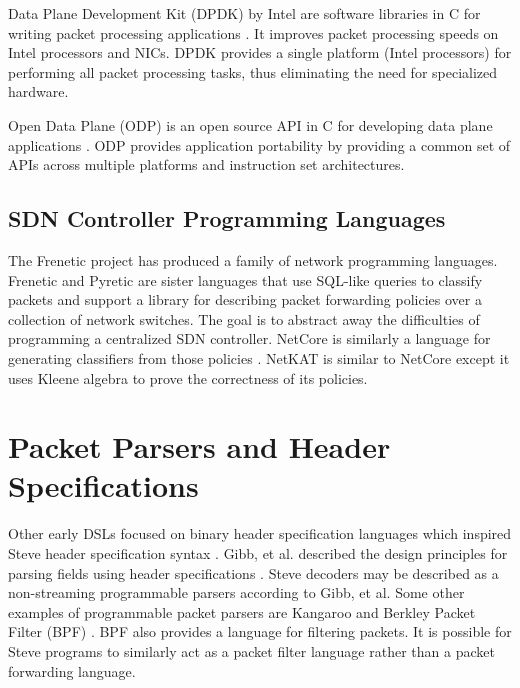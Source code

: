 Data Plane Development Kit (DPDK) by Intel are software libraries in C for writing packet processing applications \cite{dpdk_webpage}. It improves packet processing speeds on Intel processors and NICs. DPDK provides a single platform (Intel processors) for performing all packet processing tasks, thus eliminating the need for specialized hardware.

Open Data Plane (ODP) is an open source API in C for developing data plane applications \cite{odp_webpage}. ODP provides application portability by providing a common set of APIs across multiple platforms and instruction set architectures.

\subsection{SDN Controller Programming Languages} \label{rel:frenetic}

The Frenetic project has produced a family of network programming
languages. Frenetic \cite{foster2011frenetic, foster2013frenetic} and Pyretic \cite{modularpyretic} are sister languages
that use SQL-like queries to classify packets and support a library for describing
packet forwarding policies over a collection of network switches. The goal is to
abstract away the difficulties of programming a centralized SDN controller.
NetCore is similarly a language for
generating classifiers from those policies \cite{monsanto2012netcore}. 
NetKAT is similar to NetCore except it uses Kleene algebra \cite{kozen2014netkat, anderson2014netkat} to prove the correctness of its policies.

\section{Packet Parsers and Header Specifications}

Other early DSLs focused on binary header specification languages which inspired Steve header specification syntax \cite{binpac, packet_types, datascript}.
Gibb, et al. described the design principles for parsing fields using header specifications
\cite{parser2013gibb}. Steve decoders may be described as a non-streaming programmable parsers according to Gibb, et al.
Some other examples of programmable packet parsers are Kangaroo \cite{kangaroo} and Berkley Packet Filter (BPF) \cite{bpf1993mccanne}. BPF also provides a language for filtering packets. It is possible for Steve programs to similarly act as a packet filter language rather than a packet forwarding language.


